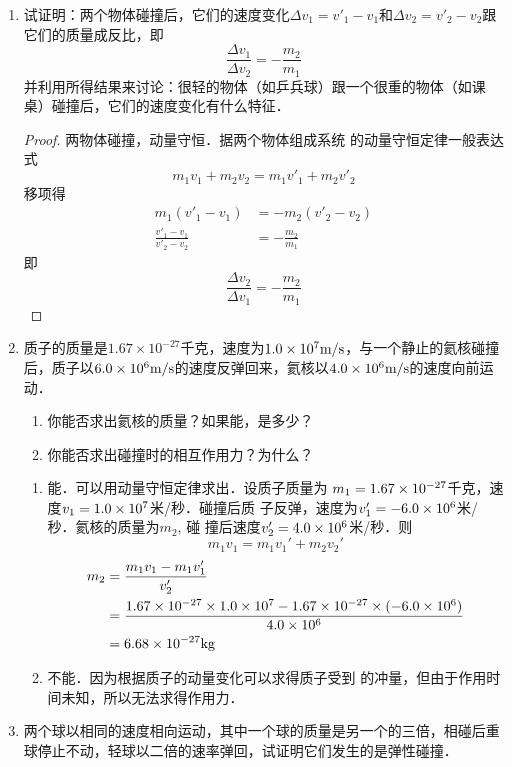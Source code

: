 \begin{enumerate}
\begin{solution}
\begin{enumerate}
\end{enumerate}
\end{solution}
\item 试证明：两个物体碰撞后，它们的速度变化$\Delta v_1=v'_1-v_1$和$\Delta v_2=v'_2-v_2$跟它们的质量成反比，即
\[\frac{\Delta v_1}{\Delta v_2}=-\frac{m_2}{m_1}\]
并利用所得结果来讨论：很轻的物体（如乒兵球）跟一个很重的物体（如课桌）碰撞后，它们的速度变化有什么特征．

\begin{proof}
    两物体碰撞，动量守恒．据两个物体组成系统
    的动量守恒定律一般表达式
    \[m_1v_1+m_2v_2=m_1v'_1+m_2v'_2\]
    移项得
   \[\begin{split}
       m_1(v'_1-v_1)&=-m_2(v'_2-v_2)\\
       \frac{v'_1-v_1}{v'_2-v_2}&=-\frac{m_2}{m_1}
   \end{split} \]
    即
\[\frac{\Delta v_2}{\Delta v_1}=-\frac{m_2}{m_1}\]
\end{proof}
\item 质子的质量是$1.67\times 10^{-27}$千克，速度为$1.0\times 10^7\text{m}/\text{s}$，与一个静止的氦核碰撞后，质子以$6.0\times 10^6\text{m}/\text{s}$的速度反弹回来，氦核以$4.0\times 10^6\text{m}/\text{s}$的速度向前运动．
   \begin{enumerate}
       \item 你能否求出氦核的质量？如果能，是多少？
       \item 你能否求出碰撞时的相互作用力？为什么？
   \end{enumerate}

   \begin{solution}
\begin{enumerate}
    \item 能．可以用动量守恒定律求出．设质子质量为
    $m_1=1.67\times10^{-27}$千克，速度$v_1=1.0\times10^7$米/秒．碰撞后质
    子反弹，速度为$v'_1=-6.0\times10^6$米/秒．氦核的质量为$m_2$, 碰
    撞后速度$v'_2=4.0\times10^6$米/秒．则
\[m_1v_1=m_1v_1'+m_2v_2'\]
\[\begin{split}
    m_2&=\frac{m_1v_1-m_1v_1'}{v_2'}\\
    &=\frac{ 1.67\times10^{-27}\times1.0\times10^7-1.67\times10^{-27} \times(-6.0\times10^6)}{4.0\times10^6}\\
    &=6.68\times10^{-27}{\rm kg}
\end{split}
\]
    \item 不能．因为根据质子的动量变化可以求得质子受到
    的冲量，但由于作用时间未知，所以无法求得作用力．
\end{enumerate}
   \end{solution}
   \item 两个球以相同的速度相向运动，其中一个球的质量是另一个的三倍，相碰后重球停止不动，轻球以二倍的速率弹回，试证明它们发生的是弹性碰撞．


\end{enumerate}
